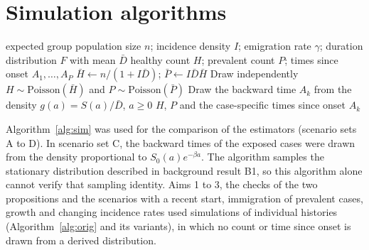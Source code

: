 \section{Simulation algorithms}\label{supp:algorithm}

\begin{algorithm}[!ht]
\caption{Sampling a prevalence survey of one exposure group from the stationary distribution of background result B1 (comparison of the estimators, Aim 4).}
\label{alg:sim}
\begin{algorithmic}[1]
\Require expected group population size $n$; incidence density $I$; emigration rate $\gamma$; duration distribution $F$ with mean $\bar D$
\Ensure healthy count $H$; prevalent count $P$; times since onset $A_1,\dots,A_P$
\State $\bar H\gets n/(1+I\bar D)$; $\bar P\gets I\bar D\bar H$
\State Draw independently $H\sim\mathrm{Poisson}(\bar H)$ and $P\sim\mathrm{Poisson}(\bar P)$
  \State Draw the backward time $A_k$ from the density $g(a)=S(a)/\bar D$, $a\ge0$
\EndFor
\State \Return $H$, $P$ and the case-specific times since onset $A_k$
\end{algorithmic}
\end{algorithm}

Algorithm~\ref{alg:sim} was used for the comparison of the estimators (scenario sets A to D). In scenario set C, the backward times of the exposed cases were drawn from the density proportional to $S_0(a)e^{-\beta a}$. The algorithm samples the stationary distribution described in background result B1, so this algorithm alone cannot verify that sampling identity. Aims 1 to 3, the checks of the two propositions and the scenarios with a recent start, immigration of prevalent cases, growth and changing incidence rates used simulations of individual histories (Algorithm~\ref{alg:orig} and its variants), in which no count or time since onset is drawn from a derived distribution.

